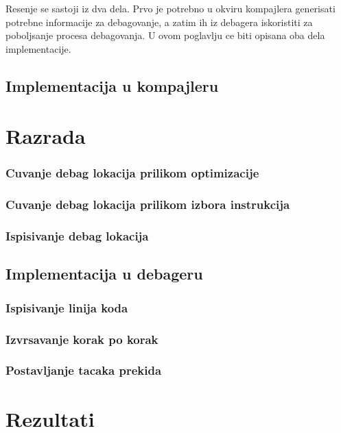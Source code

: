 \documentclass[12pt,oneside]{memoir}
\begin{document}
Resenje se sastoji iz dva dela. Prvo je potrebno u okviru kompajlera generisati potrebne informacije za debagovanje, a zatim ih iz debagera iskoristiti za poboljsanje procesa debagovanja.
U ovom poglavlju ce biti opisana oba dela implementacije.

\section{Implementacija u kompajleru}


\chapter{Razrada}
\label{chp:razrada}

\subsection{Cuvanje debag lokacija prilikom optimizacije}

\subsection{Cuvanje debag lokacija prilikom izbora instrukcija}

\subsection{Ispisivanje debag lokacija}

\section{Implementacija u debageru}

\subsection{Ispisivanje linija koda}

\subsection{Izvrsavanje korak po korak}

\subsection{Postavljanje tacaka prekida}

\chapter{Rezultati}
\end{document}
